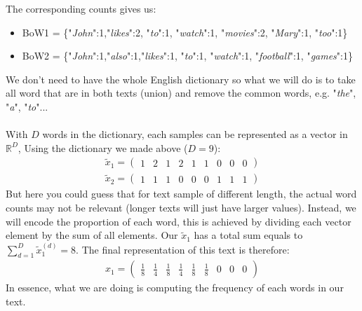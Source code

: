 	\begin{center}
	\end{center}
	
	\begin{center}
	\end{center}
	
	The corresponding counts gives us:
	\begin{itemize}
		\item BoW1 = \{"\textit{John}":1,"\textit{likes}":2, "\textit{to}":1, "\textit{watch}":1, "\textit{movies}":2, "\textit{Mary}":1, "\textit{too}":1\}
		\item BoW2 = \{"\textit{John}":1,"\textit{also}":1,"\textit{likes}":1, "\textit{to}":1, "\textit{watch}":1, "\textit{football}":1, "\textit{games}":1\}
	\end{itemize}
	We don't need to have the whole English dictionary so what we will do is to take all word that are in both texts (union) and remove the common words, e.g. "\textit{the}", "\textit{a}", "\textit{to}"...\\
	$ $\\
	With $D$ words in the dictionary, each samples can be represented as a vector in $\mathbb{R}^{D}$, Using the dictionary we made above ($D = 9$):
	\begin{align*} 
		\widetilde{x}_1 = \begin{pmatrix} 1 & 2 & 1 & 2 & 1 & 1 & 0 & 0 & 0 \end{pmatrix} \\
		\widetilde{x}_2 =  \begin{pmatrix} 1 & 1 & 1 & 0 & 0 & 0 & 1 & 1 & 1 \end{pmatrix} 
	\end{align*}
	But here you could guess that for text sample of different length, the actual word counts may not be relevant (longer texts will just have larger values). Instead, we will encode the proportion of each word, this is achieved by dividing each vector element by the sum of all elements. Our $\widetilde{x}_1$ has a total sum equals to $\sum_{d= 1}^{D}\widetilde{x}_1^{\left(d\right)}= 8$. The final representation of this text is therefore:
	\begin{align*} 
		x_1 = \begin{pmatrix} \frac{1}{8} & \frac{1}{4} & \frac{1}{8} & \frac{1}{4} & \frac{1}{8} & \frac{1}{8} & 0 & 0 & 0 \end{pmatrix} 
	\end{align*}
	In essence, what we are doing is computing the frequency of each words in our text.
	


